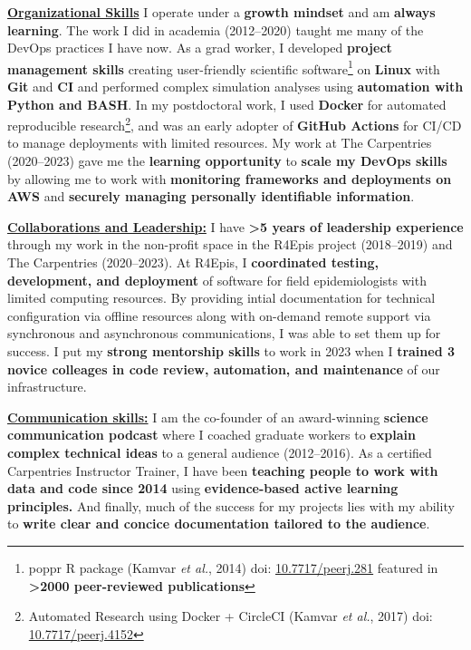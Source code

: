 \vspace{2ex}

\underline{\textbf{Organizational Skills}}
I operate under a \textbf{growth mindset} and am \textbf{always learning}.
The work I did in academia (2012--2020) taught me many of the DevOps practices I have now.
As a grad worker, I developed \textbf{project management skills} creating user-friendly scientific software\footnote{poppr R package (Kamvar \textit{et al.}, 2014) doi: \href{https://doi.org/10.7717/peerj.281}{10.7717/peerj.281} featured in \textbf{\textgreater2000 peer-reviewed publications}} on \textbf{Linux} with \textbf{Git} and \textbf{CI} and 
performed complex simulation analyses using \textbf{automation with Python and BASH}.
In my postdoctoral work, I used \textbf{Docker} for automated reproducible research\footnote{Automated Research using Docker + CircleCI (Kamvar \textit{et al.}, 2017) doi: \href{https://doi.org/10.7717/peerj.4152}{10.7717/peerj.4152}}, 
and was an early adopter of \textbf{GitHub Actions} for CI/CD to manage deployments with limited resources.
My work at The Carpentries (2020--2023) gave me the \textbf{learning opportunity} to \textbf{scale my DevOps skills} by allowing me to work with \textbf{monitoring frameworks and deployments on AWS} and \textbf{securely managing personally identifiable information}. 

\vspace{2ex}

\underline{\textbf{Collaborations and Leadership:}}
I have \textbf{\textgreater5 years of leadership experience} through my work in the non-profit space in the R4Epis project (2018--2019) and The Carpentries (2020--2023).
At R4Epis, I \textbf{coordinated testing, development, and deployment} of software for field epidemiologists with limited computing resources.
By providing intial documentation for technical configuration via offline resources along with on-demand remote support via synchronous and asynchronous communications, I was able to set them up for success.
I put my \textbf{strong mentorship skills} to work in 2023 when I \textbf{trained 3 novice colleages in code review, automation, and maintenance} of our infrastructure.


\vspace{2ex}

\underline{\textbf{Communication skills:}}
I am the co-founder of an award-winning \textbf{science communication podcast} where I coached graduate workers to \textbf{explain complex technical ideas} to a general audience (2012--2016).
As a certified Carpentries Instructor Trainer, I have been \textbf{teaching people to work with data and code since 2014} using \textbf{evidence-based active learning principles.} 
And finally, much of the success for my projects lies with my ability to \textbf{write clear and concice documentation tailored to the audience}.


